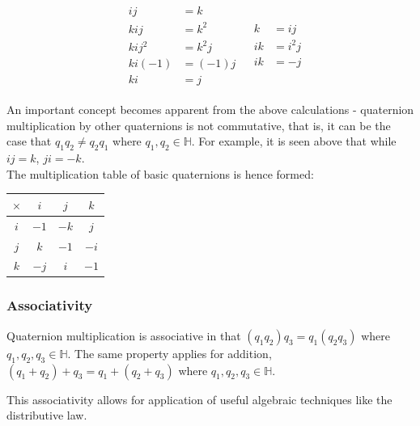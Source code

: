 \documentclass[12pt, a4paper]{article}
\begin{document}
\begin{align*}
     &
    \begin{aligned}
        ij     & = k     \\
        kij    & = k^2   \\
        kij^2  & = k^2j  \\
        ki(-1) & = (-1)j \\
        ki     & = j
    \end{aligned}
     &
    \begin{aligned}
        k  & = ij   \\
        ik & = i^2j \\
        ik & = -j
    \end{aligned}
\end{align*}

An important concept becomes apparent from the above calculations - quaternion
multiplication by other quaternions is not commutative, that is, it can be the
case that $q_1q_2 \neq q_2q_1$ where $ q_1,q_2 \in \mathbb{H}$. For example, it
is seen above that while $ij = k$, $ji = -k$. \\

The multiplication table of basic quaternions is hence formed:

\begin{center}
    \doublespacing
    \begin{tabular}{ | c | c | c | c | }
        \hline
        $\times$ & $i$  & $j$  & $k$  \\
        \hline
        $i$      & $-1$ & $-k$ & $j$  \\
        \hline
        $j$      & $k$  & $-1$ & $-i$ \\
        \hline
        $k$      & $-j$ & $i$  & $-1$ \\
        \hline
    \end{tabular}
    \label{sophisticatedtable}
\end{center}

\subsubsection{Associativity}
Quaternion multiplication is associative in that $(q_1 q_2) q_3 = q_1 (q_2 q_3)$
where $q_1,q_2,q_3 \in \mathbb{H}$.
The same property applies for addition, $(q_1 + q_2) + q_3 = q_1 + (q_2 + q_3)$
where $q_1,q_2,q_3 \in \mathbb{H}$.

This associativity allows for application of useful algebraic
techniques like the distributive law.
\end{document}
